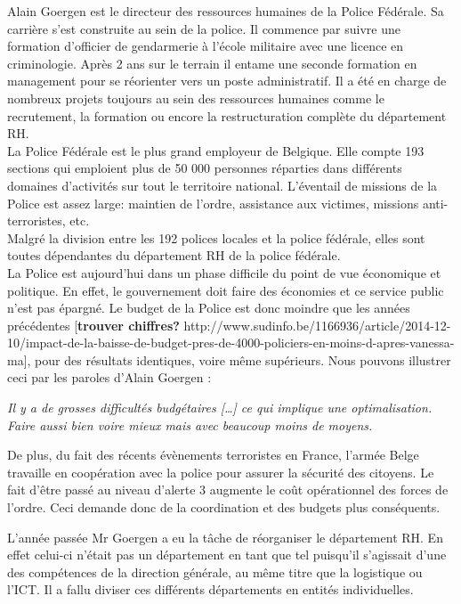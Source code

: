 
Alain Goergen est le directeur des ressources humaines de la Police Fédérale. Sa carrière s'est construite au sein de la police. Il commence par suivre une formation d'officier de gendarmerie à l'école militaire avec une licence en criminologie. Après 2 ans sur le terrain il entame une seconde formation en management pour se réorienter vers un poste administratif. Il a été en charge de nombreux projets toujours au sein des ressources humaines comme le recrutement, la formation ou encore la restructuration complète du département RH.\\

La Police Fédérale est le plus grand employeur de Belgique. Elle compte 193 sections qui emploient plus de 50 000 personnes réparties dans différents domaines d'activités sur tout le territoire national. L'éventail de missions de la Police est assez large: maintien de l'ordre, assistance aux victimes, missions anti-terroristes, etc.\\
Malgré la division entre les 192 polices locales et la police fédérale, elles sont toutes dépendantes du département RH de la police fédérale.\\
 
La Police est aujourd'hui dans un phase difficile du point de vue économique et politique. En effet, le gouvernement doit faire des économies et ce service public n'est pas épargné. Le budget de la Police est donc moindre que les années précédentes [\textbf{trouver chiffres?} http://www.sudinfo.be/1166936/article/2014-12-10/impact-de-la-baisse-de-budget-pres-de-4000-policiers-en-moins-d-apres-vanessa-ma], pour des résultats identiques, voire même supérieurs. Nous pouvons illustrer ceci par les paroles d'Alain Goergen : 

\begin{center}
	\textit{Il y a de grosses difficultés budgétaires [\ldots] ce qui implique une optimalisation. Faire aussi bien voire mieux mais avec beaucoup moins de moyens.}
\end{center} 

De plus, du fait des récents évènements terroristes en France, l'armée Belge travaille en coopération avec la police pour assurer la sécurité des citoyens. Le fait d'être passé au niveau d'alerte 3 augmente le coût opérationnel des forces de l'ordre. Ceci demande donc de la coordination et des budgets plus conséquents.

L'année passée Mr Goergen a eu la tâche de réorganiser le département RH. En effet celui-ci n'était pas un département en tant que tel puisqu'il s'agissait d'une des compétences de la direction générale, au même titre que la logistique ou l'ICT. Il a fallu diviser ces différents départements en entités individuelles.\\

